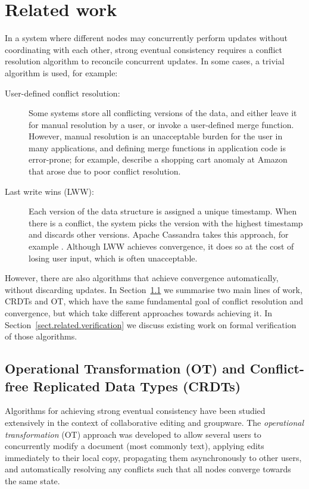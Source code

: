 \section{Related work}\label{sect.relatedwork}

In a system where different nodes may concurrently perform updates without coordinating with each other, strong eventual consistency requires a conflict resolution algorithm to reconcile concurrent updates. 
In some cases, a trivial algorithm is used, for example:

\begin{description}
\item[User-defined conflict resolution:] Some systems store all conflicting versions of the data,
and either leave it for manual resolution by a user, or invoke a user-defined merge function.
However, manual resolution is an unacceptable burden for the user in many applications, and defining
merge functions in application code is error-prone; for example, \citet{DeCandia:2007ui} describe a
shopping cart anomaly at Amazon that arose due to poor conflict resolution.

\item[Last write wins (LWW):] Each version of the data structure is assigned a unique timestamp.
When there is a conflict, the system picks the version with the highest timestamp and discards other
versions. Apache Cassandra takes this approach, for example \cite{KingsburyCassandra}.
Although LWW achieves convergence, it does so at the cost of losing user input, which is often unacceptable.
\end{description}

However, there are also algorithms that achieve convergence automatically, without discarding updates.
In Section~\ref{sect.related.ot.crdts} we summarise two main lines of work, CRDTs and OT, which have the same fundamental goal of conflict resolution and convergence, but which take different approaches towards achieving it.
In Section~\ref{sect.related.verification} we discuss existing work on formal verification of those algorithms.

\vspace{-0.25em}
\subsection{Operational Transformation (OT) and Conflict-free Replicated Data Types (CRDTs)}\label{sect.related.ot.crdts}

Algorithms for achieving strong eventual consistency have been studied extensively in the context of collaborative editing and groupware.
The \emph{operational transformation} (OT) approach was developed to allow several users to concurrently modify a document (most commonly text), applying edits immediately to their local copy, propagating them asynchronously to other users, and automatically resolving any conflicts such that all nodes converge towards the same state.

